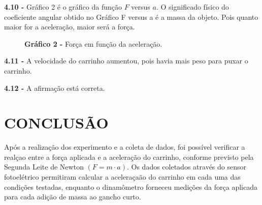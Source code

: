 \documentclass[article,12pt,oneside,a4paper,brazil]{abntex2}
\begin{document}
\begin{flushleft}
		\textbf{4.10 -} Gráfico 2 é o gráfico da função $F$ versus $a$. O significado físico do coeficiente angular obtido no Gráfico F versus a é a massa da objeto. Pois quanto maior for a aceleração, maior será a força.
		
		\begin{center}
			\begin{figure}[h!]
				\centering
				
				\begin{flushleft}
					\textbf{Gráfico 2 -} Força em função da aceleração.
				\end{flushleft}
				\label{fig:grafo-tabela2}
			\end{figure}
		\end{center}
		
		\textbf{4.11 -} A velocidade do carrinho aumentou, pois havia mais peso para puxar o carrinho.
		
		\textbf{4.12 -} A afirmação está correta.
	\end{flushleft}
	
	\section{CONCLUSÃO}
	
	Após a realização dos experimento e a coleta de dados, foi possível verificar a realçao entre a força aplicada e a aceleração do carrinho, conforme previsto pela Segunda Leite de Newton $(F = m \cdot a)$. Os dados coletados através do sensor fotoelétrico permitiram calcular a aceleraçaão do carrinho em cada uma das condições testadas, enquanto o dinamômetro forneceu medições da força aplicada para cada adição de massa ao gancho curto. 
	
\end{document}

